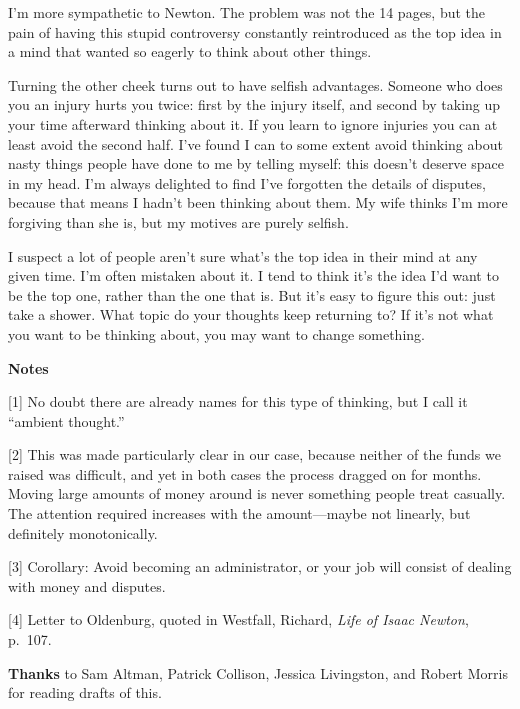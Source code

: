 I'm more sympathetic to Newton. The problem was not the 14 pages, but
the pain of having this stupid controversy constantly reintroduced as
the top idea in a mind that wanted so eagerly to think about other
things.

Turning the other cheek turns out to have selfish advantages. Someone
who does you an injury hurts you twice: first by the injury itself, and
second by taking up your time afterward thinking about it. If you learn
to ignore injuries you can at least avoid the second half. I've found I
can to some extent avoid thinking about nasty things people have done to
me by telling myself: this doesn't deserve space in my head. I'm always
delighted to find I've forgotten the details of disputes, because that
means I hadn't been thinking about them. My wife thinks I'm more
forgiving than she is, but my motives are purely selfish.

I suspect a lot of people aren't sure what's the top idea in their mind
at any given time. I'm often mistaken about it. I tend to think it's the
idea I'd want to be the top one, rather than the one that is. But it's
easy to figure this out: just take a shower. What topic do your thoughts
keep returning to? If it's not what you want to be thinking about, you
may want to change something.

\textbf{Notes}

{[}1{]} No doubt there are already names for this type of thinking, but
I call it ``ambient thought.''

{[}2{]} This was made particularly clear in our case, because neither of
the funds we raised was difficult, and yet in both cases the process
dragged on for months. Moving large amounts of money around is never
something people treat casually. The attention required increases with
the amount---maybe not linearly, but definitely monotonically.

{[}3{]} Corollary: Avoid becoming an administrator, or your job will
consist of dealing with money and disputes.

{[}4{]} Letter to Oldenburg, quoted in Westfall, Richard, \emph{Life of
Isaac Newton}, p.~107.

\textbf{Thanks} to Sam Altman, Patrick Collison, Jessica Livingston, and
Robert Morris for reading drafts of this.
